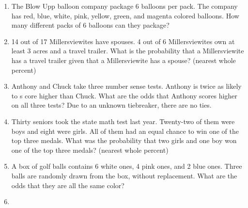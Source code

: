 \documentclass[../uilmath.tex]{subfiles}
\begin{document}
\begin{enumerate}[label=\bfseries\arabic*.]
    \item %
    The Blow Upp balloon company package 6 balloons per pack. The company has red, blue, white, pink, yellow,
    green, and magenta colored balloons. How many different packs of 6 balloons can they package?

    \item %
    14 out of 17 Millersviewites have spouses. 4 out of 6 Millersviewites own at least 3 acres and a travel trailer. What is the probability
    that a Millersviewite has a travel trailer given that a Millersviewite has a spouse? (nearest whole percent)

    \item %
    Anthony and Chuck take three number sense tests. Anthony is twice as likely to s core higher than Chuck. What are the odds that Anthony scores higher on all three tests? Due to an unknown tiebreaker, there are no ties.

    \item %
    Thirty seniors took the state math test last year. Twenty-two of them were boys and eight were girls. All of them had an equal chance to win one 
    of the top three medals. What was the probability that two girls and one boy won one of the top three medals? (nearest whole percent)

    \item %
    A box of golf balls contains 6 white ones, 4 pink ones, and 2 blue ones. Three balls are randomly drawn from the box, without replacement.
    What are the odds that they are all the same color?

    \item %
    
\end{enumerate}
\end{document}

